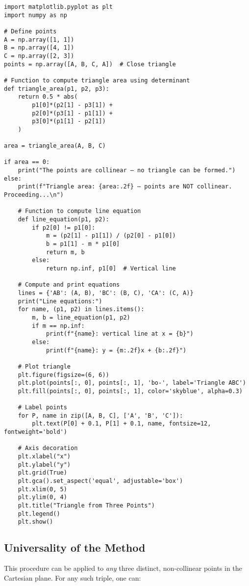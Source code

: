 \documentclass[10pt,twocolumn]{article}
\begin{document}
{\tiny
\begin{verbatim}
import matplotlib.pyplot as plt
import numpy as np

# Define points
A = np.array([1, 1])
B = np.array([4, 1])
C = np.array([2, 3])
points = np.array([A, B, C, A])  # Close triangle

# Function to compute triangle area using determinant
def triangle_area(p1, p2, p3):
    return 0.5 * abs(
        p1[0]*(p2[1] - p3[1]) +
        p2[0]*(p3[1] - p1[1]) +
        p3[0]*(p1[1] - p2[1])
    )

area = triangle_area(A, B, C)

if area == 0:
    print("The points are collinear — no triangle can be formed.")
else:
    print(f"Triangle area: {area:.2f} — points are NOT collinear. Proceeding...\n")

    # Function to compute line equation
    def line_equation(p1, p2):
        if p2[0] != p1[0]:
            m = (p2[1] - p1[1]) / (p2[0] - p1[0])
            b = p1[1] - m * p1[0]
            return m, b
        else:
            return np.inf, p1[0]  # Vertical line

    # Compute and print equations
    lines = {'AB': (A, B), 'BC': (B, C), 'CA': (C, A)}
    print("Line equations:")
    for name, (p1, p2) in lines.items():
        m, b = line_equation(p1, p2)
        if m == np.inf:
            print(f"{name}: vertical line at x = {b}")
        else:
            print(f"{name}: y = {m:.2f}x + {b:.2f}")

    # Plot triangle
    plt.figure(figsize=(6, 6))
    plt.plot(points[:, 0], points[:, 1], 'bo-', label='Triangle ABC')
    plt.fill(points[:, 0], points[:, 1], color='skyblue', alpha=0.3)

    # Label points
    for P, name in zip([A, B, C], ['A', 'B', 'C']):
        plt.text(P[0] + 0.1, P[1] + 0.1, name, fontsize=12, fontweight='bold')

    # Axis decoration
    plt.xlabel("x")
    plt.ylabel("y")
    plt.grid(True)
    plt.gca().set_aspect('equal', adjustable='box')
    plt.xlim(0, 5)
    plt.ylim(0, 4)
    plt.title("Triangle from Three Points")
    plt.legend()
    plt.show()
\end{verbatim}
}

\subsection{Universality of the Method}

This procedure can be applied to \emph{any} three distinct, non-collinear points in the Cartesian plane. For any such triple, one can:
\end{document}
